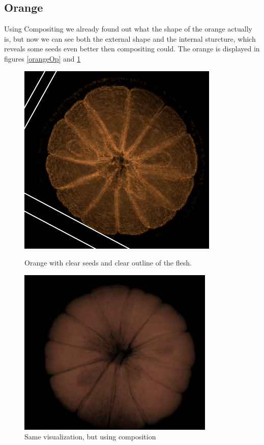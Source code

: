 \documentclass[a4paper,twoside,11pt]{article}
\begin{document}
 \subsection{Orange}
 Using Compositing we already found out what the shape of the orange actually is, but now we can see both the external shape and the internal sturcture, which reveals some seeds even better then compositing could.  The orange is displayed in figures \ref{orangeOp} and \ref{orangeCompOp}
 \begin{figure}[H]
 \includegraphics[scale=0.5]{images/orangeOp}
 \caption{Orange with clear seeds and clear outline of the flesh.}
 \label{orangeOp}
\endminipage\hfill
{}
 \includegraphics[scale=0.5]{images/orangeCompOp}
 \caption{Same visualization, but using composition}
 \label{orangeCompOp}
\endminipage\hfill
 \centering

 \end{figure}
 
\end{document}

